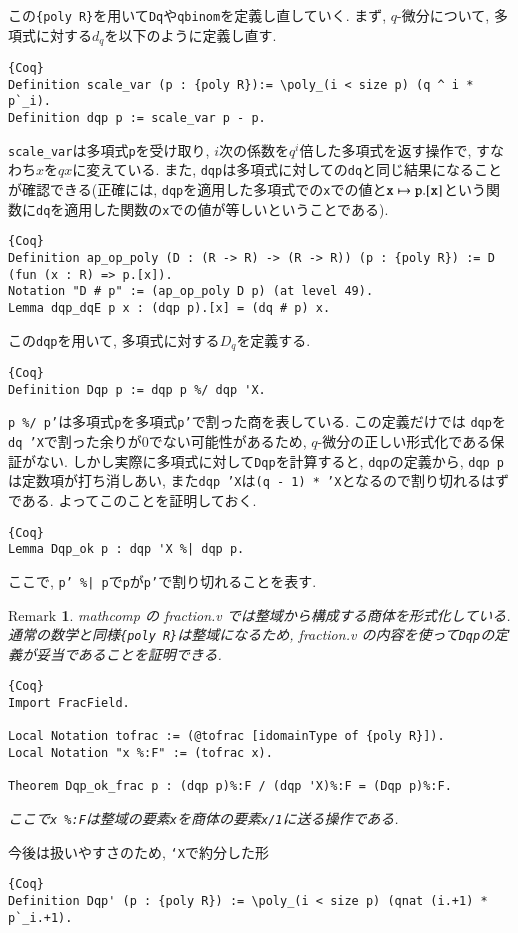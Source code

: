 \documentclass[11pt]{jsreport}
\theoremstyle{mystyle}
\newtheorem{rmk}[df]{$\textrm{Remark}$}
\newcommand{\brmk}{\begin{rmk}}
\newcommand{\ermk}{\end{rmk}}
\newcommand{\0}{\textbf{0}}
\begin{document}
この{\tt \{poly R\}}を用いて{\tt Dq}や{\tt qbinom}を定義し直していく. 
まず, $q$-微分について, 多項式に対する$d_q$を以下のように定義し直す. 
\begin{lstlisting}{Coq}
Definition scale_var (p : {poly R}):= \poly_(i < size p) (q ^ i * p`_i).
Definition dqp p := scale_var p - p. \end{lstlisting}
{\tt scale\_var}は多項式{\tt p}を受け取り, $i$次の係数を$q^i$倍した多項式を返す操作で, すなわち$x$を$qx$に変えている. また, {\tt dqp}は多項式に対しての{\tt dq}と同じ結果になることが確認できる(正確には, {\tt dqp}を適用した多項式での{\tt x}での値と${\tt x} \mapsto {\tt p.[x]}$という関数に{\tt dq}を適用した関数の{\tt x}での値が等しいということである). 
\begin{lstlisting}{Coq}
Definition ap_op_poly (D : (R -> R) -> (R -> R)) (p : {poly R}) := D (fun (x : R) => p.[x]).
Notation "D # p" := (ap_op_poly D p) (at level 49).
Lemma dqp_dqE p x : (dqp p).[x] = (dq # p) x. \end{lstlisting}
この{\tt dqp}を用いて, 多項式に対する$D_q$を定義する. 
\begin{lstlisting}{Coq}
Definition Dqp p := dqp p %/ dqp 'X.
\end{lstlisting}
{\tt p \%/ p'}は多項式{\tt p}を多項式{\tt p'}で割った商を表している. この定義だけでは
{\tt dqp}を{\tt dq 'X}で割った余りが$0$でない可能性があるため, $q$-微分の正しい形式化である保証がない. しかし実際に多項式に対して{\tt Dqp}を計算すると, {\tt dqp}の定義から, {\tt dqp p}は定数項が打ち消しあい, また{\tt dqp 'X}は{\tt (q - 1) * 'X}となるので割り切れるはずである. 
よってこのことを証明しておく.  
\begin{lstlisting}{Coq}
Lemma Dqp_ok p : dqp 'X %| dqp p.
\end{lstlisting}
ここで, {\tt p' \%| p}で{\tt p}が{\tt p'}で割り切れることを表す. 
\brmk
  mathcomp の fraction.v では整域から構成する商体を形式化している. 
  通常の数学と同様{\tt \{poly R\}}は整域になるため, fraction.v の内容を使って{\tt Dqp}の定義が妥当であることを証明できる. 
  \begin{lstlisting}{Coq}
Import FracField.

Local Notation tofrac := (@tofrac [idomainType of {poly R}]).
Local Notation "x %:F" := (tofrac x).

Theorem Dqp_ok_frac p : (dqp p)%:F / (dqp 'X)%:F = (Dqp p)%:F.
\end{lstlisting}
ここで{\tt x \%:F}は整域の要素{\tt x}を商体の要素{\tt x/1}に送る操作である. 
\ermk
今後は扱いやすさのため, {\tt `X}で約分した形
\begin{lstlisting}{Coq}
Definition Dqp' (p : {poly R}) := \poly_(i < size p) (qnat (i.+1) * p`_i.+1).
\end{lstlisting}
\end{document}
